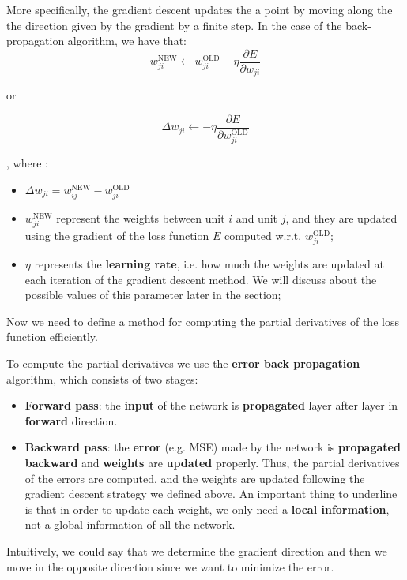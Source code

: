 More specifically, the gradient descent updates the a point by moving along the the direction given by the gradient by a finite step. In the case of the back-propagation algorithm, we have that:
$$w_{ji}^{\text{NEW}} \leftarrow w_{ji}^{\text{OLD}} - \eta \frac{\partial E}{\partial w_{ji}}$$

or

$$\Delta w_{ji} \leftarrow  - \eta \frac{\partial E}{\partial w_{ji}^{\text{OLD}}}$$

, where :

\begin{itemize}
    \item $\Delta w_{ji} = w_{ij}^{\text{NEW}} - w_{ji}^{\text{OLD}}$
    \item $w_{ji}^{\text{NEW}}$ represent the weights between unit $i$ and unit $j$, and they are updated using the gradient of the loss function $E$ computed w.r.t. $w_{ji}^{\text{OLD}}$;
    \item $\eta$ represents the \textbf{learning rate}, i.e. how much the weights are updated at each iteration of the gradient descent method. We will discuss about the possible values of this parameter later in the section;
\end{itemize}

Now we need to define a method for computing the partial derivatives of the loss function efficiently.

To compute the partial derivatives we use the \textbf{error back propagation} algorithm, which consists of two stages:

\begin{itemize}
	\item \textbf{Forward pass}: the \textbf{input} of the network is \textbf{propagated} layer after layer in \textbf{forward} direction.
	\item \textbf{Backward pass}: the \textbf{error} (e.g. MSE) made by the network is \textbf{propagated} \textbf{backward} and \textbf{weights} are \textbf{updated} properly. Thus, the partial derivatives of the errors are computed, and the weights are updated following the gradient descent strategy we defined above. An important thing to underline is that in order to update each weight, we only need a \textbf{local information}, not a global information of all the network.
\end{itemize}


Intuitively, we could say that we determine the gradient direction and then we move in the opposite direction since we want to minimize the error.

